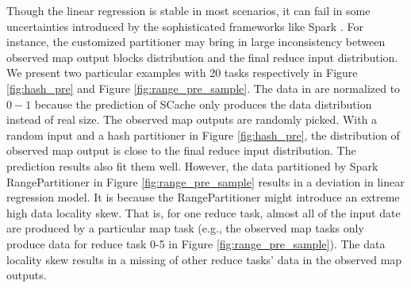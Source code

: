 Though the linear regression is stable in most scenarios, it can fail in some uncertainties introduced by the sophisticated frameworks like Spark \cite{apachespark}.  
For instance, the customized partitioner may bring in large inconsistency between observed map output blocks distribution and the final reduce input distribution. 
We present two particular examples with 20 tasks respectively in Figure \ref{fig:hash_pre} and Figure \ref{fig:range_pre_sample}. 
The data in are normalized to $0-1$ because the prediction of SCache only produces the data distribution instead of real size. 
The observed map outputs are randomly picked. 
With a random input and a hash partitioner in Figure \ref{fig:hash_pre}, the distribution of observed map output is close to the final reduce input distribution. 
The prediction results also fit them well. 
However, the data partitioned by Spark RangePartitioner \cite{apachespark} in Figure \ref{fig:range_pre_sample} results in a deviation in linear regression model. 
It is because the RangePartitioner might introduce an extreme high data locality skew. 
That is, for one reduce task, almost all of the input date are produced by a particular map task (e.g., the observed map tasks only produce data for reduce task 0-5 in Figure \ref{fig:range_pre_sample}).
The data locality skew results in a missing of other reduce tasks' data in the observed map outputs.

